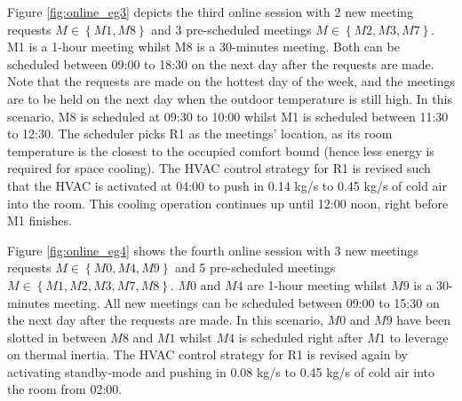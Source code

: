 Figure \ref{fig:online_eg3} depicts the third online session with 2 new meeting requests $M \in \left\{M1, M8\right\}$ and 3 pre-scheduled meetings $M \in \left\{M2, M3, M7\right\}$. M1 is a 1-hour meeting whilst M8 is a 30-minutes meeting. Both can be scheduled between 09:00 to 18:30 on the next day after the requests are made. Note that the requests are made on the hottest day of the week, and the meetings are to be held on the next day when the outdoor temperature is still high. In this scenario, M8 is scheduled at 09:30 to 10:00 whilst M1 is scheduled between 11:30 to 12:30. The scheduler picks R1 as the meetings' location, as its room temperature is the closest to the occupied comfort bound (hence less energy is required for space cooling). The HVAC control strategy for R1 is revised such that the HVAC is activated at 04:00 to push in 0.14 \mbox{kg/s} to 0.45 \mbox{kg/s} of cold air into the room. This cooling operation continues up until 12:00 noon, right before M1 finishes. %

Figure \ref{fig:online_eg4} shows the fourth online session with 3 new meetings requests $M \in \left\{M0, M4, M9\right\}$ and 5 pre-scheduled meetings $M \in \left\{M1, M2, M3, M7, M8\right\}$. $M0$ and $M4$ are 1-hour meeting whilst $M9$ is a 30-minutes meeting. All new meetings can be scheduled between 09:00 to 15:30 on the next day after the requests are made. In this scenario, $M0$ and $M9$ have been slotted in between $M8$ and $M1$ whilst $M4$ is scheduled right after $M1$ to leverage on thermal inertia. The HVAC control strategy for R1 is revised again by activating standby-mode and pushing in 0.08 \mbox{kg/s} to 0.45 \mbox{kg/s} of cold air into the room from 02:00.

